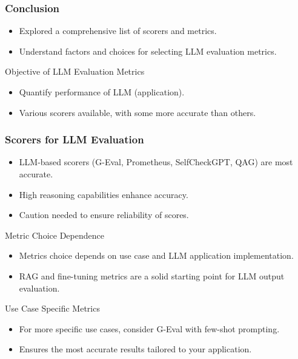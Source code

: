 \begin{frame}[fragile]\frametitle{Conclusion}
  \begin{itemize}
    \item Explored a comprehensive list of scorers and metrics.
    \item Understand factors and choices for selecting LLM evaluation metrics.
  \end{itemize}
Objective of LLM Evaluation Metrics
  \begin{itemize}
    \item Quantify performance of LLM (application).
    \item Various scorers available, with some more accurate than others.
  \end{itemize}
\end{frame}

\begin{frame}[fragile]\frametitle{Scorers for LLM Evaluation}
  \begin{itemize}
    \item LLM-based scorers (G-Eval, Prometheus, SelfCheckGPT, QAG) are most accurate.
    \item High reasoning capabilities enhance accuracy.
    \item Caution needed to ensure reliability of scores.
  \end{itemize}
Metric Choice Dependence
  \begin{itemize}
    \item Metrics choice depends on use case and LLM application implementation.
    \item RAG and fine-tuning metrics are a solid starting point for LLM output evaluation.
  \end{itemize}
Use Case Specific Metrics
  \begin{itemize}
    \item For more specific use cases, consider G-Eval with few-shot prompting.
    \item Ensures the most accurate results tailored to your application.
  \end{itemize}
\end{frame}
